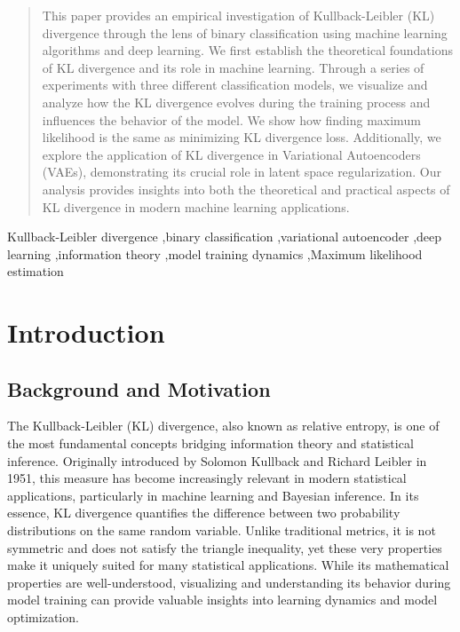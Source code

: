 \documentclass[preprint,12pt]{elsarticle}
\begin{document}
\begin{frontmatter}
\begin{abstract}
This paper provides an empirical investigation of Kullback-Leibler (KL) divergence through the lens of binary classification using machine learning algorithms and deep learning. We first establish the theoretical foundations of KL divergence and its role in machine learning. Through a series of experiments with three different classification models, we visualize and analyze how the KL divergence evolves during the training process and influences the behavior of the model. We show how finding maximum likelihood is the same as minimizing KL divergence loss. Additionally, we explore the application of KL divergence in Variational Autoencoders (VAEs), demonstrating its crucial role in latent space regularization. Our analysis provides insights into both the theoretical and practical aspects of KL divergence in modern machine learning applications.
\end{abstract}

\begin{keyword}
Kullback-Leibler divergence \sep binary classification \sep variational autoencoder \sep deep learning \sep information theory \sep model training dynamics \sep Maximum likelihood estimation
\end{keyword}


\end{frontmatter}


\section{Introduction}

\subsection{Background and Motivation}
The Kullback-Leibler (KL) divergence, also known as relative entropy, is one of the most fundamental concepts bridging information theory and statistical inference. Originally introduced by Solomon Kullback and Richard Leibler in 1951, this measure has become increasingly relevant in modern statistical applications, particularly in machine learning and Bayesian inference. In its essence, KL divergence quantifies the difference between two probability distributions on the same random variable. Unlike traditional metrics, it is not symmetric and does not satisfy the triangle inequality, yet these very properties make it uniquely suited for many statistical applications. While its mathematical properties are well-understood, visualizing and understanding its behavior during model training can provide valuable insights into learning dynamics and model optimization.
\end{document}
